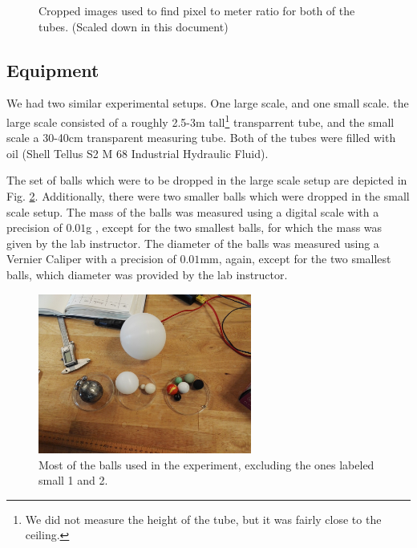 \documentclass[11pt,a4paper]{article}
\begin{document}
    \begin{figure}[H]
      \center
      \caption{Cropped images used to find pixel to meter ratio for both of the tubes. (Scaled down in this document)}
      \label{fig:scale1}
    \end{figure}
  
  \subsection{Equipment}

    We had two similar experimental setups. One large scale, and one small scale. the large scale consisted of a roughly 2.5-3m tall\footnote{We did not measure the height of the tube, but it was fairly close to the ceiling.} transparrent tube, and the small scale a 30-40cm transparent measuring tube. Both of the tubes were filled with oil (Shell Tellus S2 M 68 Industrial Hydraulic Fluid\cite{_shell_????}).

    The set of balls which were to be dropped in the large scale setup are depicted in Fig. \ref{fig:balls}. Additionally, there were two smaller balls which were dropped in the small scale setup. The mass of the balls was measured using a digital scale with a precision of $0.01$g \cite{_proscale_????}, except for the two smallest balls, for which the mass was given by the lab instructor. The diameter of the balls was measured using a Vernier Caliper with a precision of $0.01$mm, again, except for the two smallest balls, which diameter was provided by the lab instructor.

    \begin{figure}[H]
      \center
      \includegraphics[width=7cm]{scripts/figs/IMG_20180321_131204.jpg}
      \caption{Most of the balls used in the experiment, excluding the ones labeled small 1 and 2.}
      \label{fig:balls}
    \end{figure}
\end{document}
